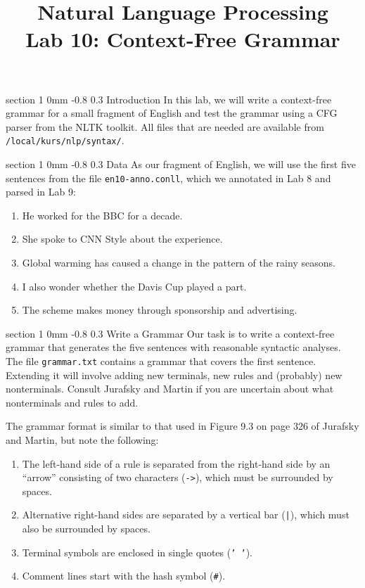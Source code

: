\documentclass[10.9pt]{article}
\title{{\LARGE Natural Language Processing}\\[1.5mm]{\large Lab 10: Context-Free Grammar}}
\author{}
\date{} %
\makeatletter
\newcommand{\newsec}[2]{\section{#1}\label{sec:#2}\noindent}
\renewcommand{\section}{\@startsection
{section}%
{1}%
{0mm}%
{-0.8\baselineskip}%
{0.3\baselineskip}%
{\bfseries\large}}%
\makeatother
\begin{document}
 

\maketitle
\vspace{-2mm}
\newsec{Introduction}{intro}%
In this lab, we will write a context-free grammar for a small fragment of English and test the grammar using a CFG parser from the NLTK toolkit. All files that are needed are available from {\tt /local/kurs/nlp/syntax/}.

\newsec{Data}{data}%
As our fragment of English, we will use the first five sentences from the file {\tt en10-anno.conll}, which we annotated in Lab 8 and parsed in Lab 9:
\begin{enumerate}[noitemsep]
\item He worked for the BBC for a decade.
\item She spoke to CNN Style about the experience.
\item Global warming has caused a change in the pattern of the rainy seasons.
\item I also wonder whether the Davis Cup played a part.
\item The scheme makes money through sponsorship and advertising.
\end{enumerate}

\newsec{Write a Grammar}{grammar}%
Our task is to write a context-free grammar that generates the five sentences with reasonable syntactic analyses. The file {\tt grammar.txt} contains a grammar that covers the first sentence. Extending it will involve adding new terminals, new rules and (probably) new nonterminals. Consult Jurafsky and Martin if you are uncertain about what nonterminals and rules to add.

\begin{center}
\fbox{

}
\end{center}
The grammar format is similar to that used in Figure 9.3 on page 326 of Jurafsky and Martin, but note the following:
\begin{enumerate}[noitemsep]
\item The left-hand side of a rule is separated from the right-hand side by an ``arrow'' consisting of two characters ({\tt ->}), which must be surrounded by spaces.
\item Alternative right-hand sides are separated by a vertical bar ({\tt |}), which must also be surrounded by spaces.
\item Terminal symbols are enclosed in single quotes ({\tt ' '}).
\item Comment lines start with the hash symbol ({\tt \#}).
\end{enumerate}
\end{document}
